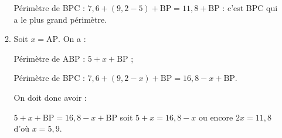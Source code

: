 \begin{enumerate}
\begin{enumerate}
Périmètre de BPC : $7,6 + (9,2 - 5) + \text{BP} = 11,8 + \text{BP}$ : c'est BPC qui a le plus grand périmètre. 
		\item %

Soit $x = \text{AP}$. On a :

Périmètre de ABP : $5 + x + \text{BP}$ ;

Périmètre de BPC : $7,6 + (9,2 - x) + \text{BP} = 16,8  - x + \text{BP}$.

On doit donc avoir :

$5 + x + \text{BP} = 16,8  - x + \text{BP}$ soit $5 + x  = 16,8 - x$ ou encore $2x = 11,8$ d'où $x = 5,9$.
	\end{enumerate} 
\end{enumerate} 

\bigskip
 
